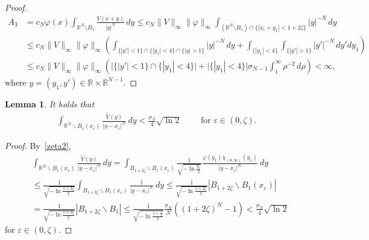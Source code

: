 \documentclass[11pt]{article}
\newcommand{\eps}{{\varepsilon}}
\newcommand{\R}{\mathbb{R}}
\numberwithin{equation}{section}
\newtheorem{lemma}[theorem]{Lemma}
\begin{document}
\begin{proof}
    \begin{align*}
        A_3
        &=c_N \varphi(x)\int_{\R^N\setminus B_1}\frac{V(x+y)}{|y|^N} \, dy
        \leq c_N \|V\|_\infty\|\varphi\|_\infty\int_{(\R^N\setminus B_1)\cap\{|x_1+y_1|<1+2\zeta\}}|y|^{-N} \, dy
        \\& 
        \le c_N\|V\|_\infty\|\varphi\|_\infty\left(
        \int_{\{|y'|<1\}\cap \{|y_1| < 4\}\cap \{|y|>1\}}|y|^{-N}\, dy +
        \int_{\{|y_1| < 4\}} \int_{\{|y'|>1\}} |y'|^{-N} \, dy' dy_1\right)\\
        & 
        \le c_N\|V\|_\infty\|\varphi\|_\infty\left(
        \Big|\{|y'|<1\}\cap \{|y_1| < 4\}\Big|+
        \Big|\{|y_1| < 4\}\Big|\sigma_{N-1}\int_{1}^\infty \rho^{-2} \, d \rho\right)
        < \infty,
    \end{align*}
    where $y=(y_1,y')\in \R\times \R^{N-1}$.
\end{proof}

\begin{lemma}\label{V:lem:3}
 It holds that
\begin{align*}
\int_{\R^N\backslash B_1(x_\eps)} \frac{\widetilde V(y)}{|y-x_\eps|^N}\ dy<\frac{\sigma_N}{4}\sqrt{\ln 2}\qquad \text{ for }\eps\in(0,\zeta).
\end{align*}
\end{lemma}
\begin{proof}
By~\eqref{zeta2},
\begin{align*}
&\int_{\R^N\backslash B_1(x_\eps)} \frac{\widetilde V(y)}{|y-x_\eps|^N}\ dy
=\int_{B_{1+2\zeta}\backslash B_1(x_\eps)} \frac{1}{\sqrt{-\ln \frac{y_1}{2}}}\frac{\varphi(y_1)\chi_{(0,\infty)}(y_1)}{|y-x_\eps|^N}\ dy\\
&\leq \frac{1}{\sqrt{-\ln \frac{1+2\zeta}{2}}}\int_{B_{1+2\zeta}\backslash B_1(x_\eps)} \frac{1}{|y-x_\eps|^N}\ dy
\leq \frac{1}{\sqrt{-\ln \frac{1+2\zeta}{2}}}|B_{1+2\zeta}\backslash B_1(x_\eps)|\\
&=\frac{1}{\sqrt{-\ln \frac{1+2\zeta}{2}}}|B_{1+2\zeta}\backslash B_1|
\leq \frac{1}{\sqrt{-\ln \frac{1+\frac{1}{2}}{2}}}
\frac{\sigma_N}{N}\left((1+2\zeta)^N-1\right)<\frac{\sigma_N}{4}\sqrt{\ln 2}
\end{align*}
for $\eps\in(0,\zeta).$
\end{proof}
\end{document}
